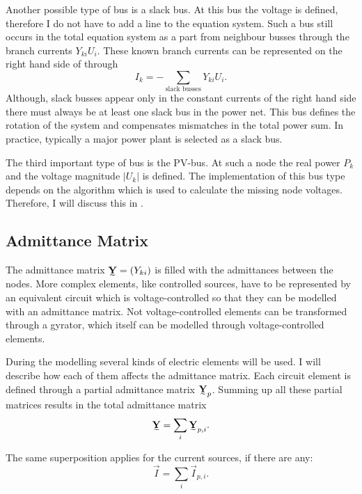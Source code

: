 Another possible type of bus is a slack bus. At this bus the voltage is defined, therefore I do not have to add a line to the equation system. Such a bus still occurs in the total equation system as a part from neighbour busses through the branch currents $Y_{ki} U_i$. These known branch currents can be represented on the right hand side of  through
\begin{equation}
	I_k = -\sum_{\text{slack busses}} Y_{ki} U_i.
\end{equation}
Although, slack busses appear only in the constant currents of the right hand side there must always be at least one slack bus in the power net. This bus defines the rotation of the system and compensates mismatches in the total power sum. In practice, typically a major power plant is selected as a slack bus.

The third important type of bus is the PV-bus. At such a node the real power $P_k$ and the voltage magnitude $|U_k|$ is defined. The implementation of this bus type depends on the algorithm which is used to calculate the missing node voltages. Therefore, I will discuss this in .

\subsection{Admittance Matrix}

The admittance matrix $\mat Y = (Y_{ki})$ is filled with the admittances between the nodes. More complex elements, like controlled sources, have to be represented by an equivalent circuit which is voltage-controlled so that they can be modelled with an admittance matrix. Not voltage-controlled elements can be transformed through a gyrator, which itself can be modelled through voltage-controlled elements.

During the modelling several kinds of electric elements will be used. I will describe how each of them affects the admittance matrix. Each circuit element is defined through a partial admittance matrix $\mat Y_p$. Summing up all these partial matrices results in the total admittance matrix
\begin{equation}
	\mat Y = \sum_i \mat Y_{p,i}.
\end{equation}

The same superposition applies for the current sources, if there are any:
\begin{equation}
	\vec I = \sum_i \vec I_{p,i}.
\end{equation}

